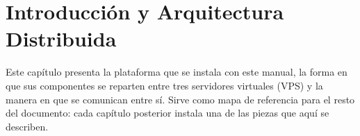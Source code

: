 \section{Introducción y Arquitectura Distribuida}\label{cap:01_introduccion_arquitectura}
Este capítulo presenta la plataforma que se instala con este manual, la forma en que sus componentes se reparten entre tres servidores virtuales (VPS) y la manera en que se comunican entre sí. Sirve como mapa de referencia para el resto del documento: cada capítulo posterior instala una de las piezas que aquí se describen.




